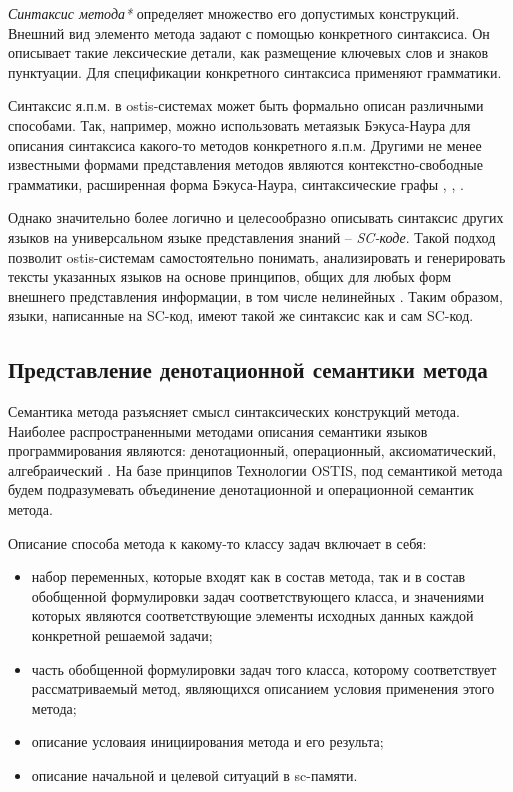 \textit{Синтаксис метода*} определяет множество его допустимых конструкций. Внешний вид элементо метода задают с помощью конкретного синтаксиса. Он описывает такие лексические детали, как размещение ключевых слов и знаков пунктуации. Для спецификации конкретного синтаксиса применяют грамматики.

Синтаксис я.п.м. в ostis-системах может быть формально описан различными способами. Так, например, можно использовать метаязык Бэкуса-Наура для описания синтаксиса какого-то методов конкретного я.п.м. Другими не менее известными формами представления методов являются контекстно-свободные грамматики, расширенная форма Бэкуса-Наура, синтаксические графы \cite{Sebesta2012}, \cite{Scott2006}, \cite{Scott1972}.

Однако значительно более логично и целесообразно описывать синтаксис других языков на универсальном языке представления знаний -- \textit{SC-коде}. Такой подход позволит ostis-системам самостоятельно понимать, анализировать и генерировать тексты указанных языков на основе принципов, общих для любых форм внешнего представления информации, в том числе нелинейных \cite{Petrov1978}. Таким образом, языки, написанные на SC-код, имеют такой же синтаксис как и сам SC-код.

\subsection{Представление денотационной семантики метода}

Семантика метода разъясняет смысл синтаксических конструкций метода. Наиболее распространенными методами описания семантики языков программирования являются: денотационный, операционный, аксиоматический, алгебраический \cite{Orlov2013}. На базе принципов Технологии OSTIS, под семантикой метода будем подразумевать объединение денотационной и операционной семантик метода.

Описание способа  метода к какому-то классу задач включает в себя:
\begin{itemize}
    \item набор переменных, которые входят как в состав метода, так и в состав обобщенной формулировки задач соответствующего класса, и значениями которых являются соответствующие элементы исходных данных каждой конкретной решаемой задачи;
    \item часть обобщенной формулировки задач того класса, которому соответствует рассматриваемый метод, являющихся описанием условия применения этого метода;
    \item описание условаия инициирования метода и его результа;
    \item описание начальной и целевой ситуаций в sc-памяти.
\end{itemize}

